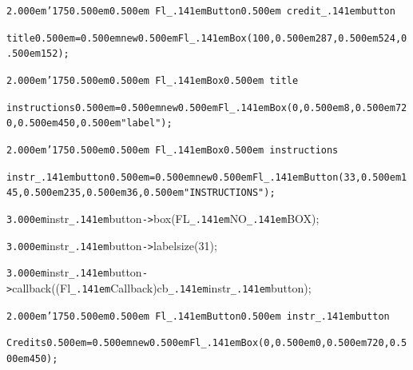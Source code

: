\documentclass[12pt]{article}
\begin{document}
\noindent
{}{\tt\mc \kern2.000em}{\tt\char'175}{\tt\mc \kern0.500em}\tt\mc {\tt /}{\tt /}\kern0.500em Fl{\tt\_\kern.141em}Button{\tt *}\kern0.500em credit{\tt\_\kern.141em}button

\noindent
\tt{}title{\tt\mc \kern0.500em}={\tt\mc \kern0.500em}new{\tt\mc \kern0.500em}Fl{\tt\_\kern.141em}Box(100,{\tt\mc \kern0.500em}287,{\tt\mc \kern0.500em}524,{\tt\mc \kern0.500em}152);

\noindent
{}{\tt\mc \kern2.000em}{\tt\char'175}{\tt\mc \kern0.500em}\tt\mc {\tt /}{\tt /}\kern0.500em Fl{\tt\_\kern.141em}Box{\tt *}\kern0.500em title

\noindent
\tt{}instructions{\tt\mc \kern0.500em}={\tt\mc \kern0.500em}new{\tt\mc \kern0.500em}Fl{\tt\_\kern.141em}Box(0,{\tt\mc \kern0.500em}8,{\tt\mc \kern0.500em}720,{\tt\mc \kern0.500em}450,{\tt\mc \kern0.500em}{\tt "}label{\tt "});

\noindent
{}{\tt\mc \kern2.000em}{\tt\char'175}{\tt\mc \kern0.500em}\tt\mc {\tt /}{\tt /}\kern0.500em Fl{\tt\_\kern.141em}Box{\tt *}\kern0.500em instructions

\noindent
\tt{}instr{\tt\_\kern.141em}button{\tt\mc \kern0.500em}={\tt\mc \kern0.500em}new{\tt\mc \kern0.500em}Fl{\tt\_\kern.141em}Button(33,{\tt\mc \kern0.500em}145,{\tt\mc \kern0.500em}235,{\tt\mc \kern0.500em}36,{\tt\mc \kern0.500em}{\tt "}INSTRUCTIONS{\tt "});

\noindent
{}{\tt\mc \kern3.000em}instr{\tt\_\kern.141em}button{\tt -}{\tt >}box(FL{\tt\_\kern.141em}NO{\tt\_\kern.141em}BOX);

\noindent
{}{\tt\mc \kern3.000em}instr{\tt\_\kern.141em}button{\tt -}{\tt >}labelsize(31);

\noindent
{}{\tt\mc \kern3.000em}instr{\tt\_\kern.141em}button{\tt -}{\tt >}callback((Fl{\tt\_\kern.141em}Callback{\tt *})cb{\tt\_\kern.141em}instr{\tt\_\kern.141em}button);

\noindent
{}{\tt\mc \kern2.000em}{\tt\char'175}{\tt\mc \kern0.500em}\tt\mc {\tt /}{\tt /}\kern0.500em Fl{\tt\_\kern.141em}Button{\tt *}\kern0.500em instr{\tt\_\kern.141em}button

\noindent
\tt{}Credits{\tt\mc \kern0.500em}={\tt\mc \kern0.500em}new{\tt\mc \kern0.500em}Fl{\tt\_\kern.141em}Box(0,{\tt\mc \kern0.500em}0,{\tt\mc \kern0.500em}720,{\tt\mc \kern0.500em}450);
\end{document}
